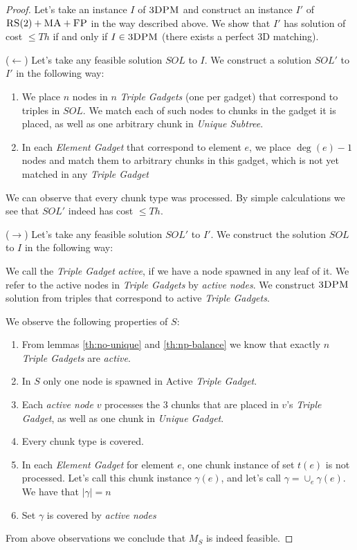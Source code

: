 \documentclass[preprint,12pt]{elsarticle}
\newcommand{\FP}{\textsc{FP}}
\newcommand{\RS}{\textsc{RS}}
\newcommand{\MA}{\textsc{MA}}
\newcommand{\TDPM}{\textsc{3DPM}}
\newcommand{\Unmatched}{\gamma}
\newcommand{\ActiveNode}{\textit{active node}}
\newcommand{\ActiveNodes}{\textit{active nodes}}
\newcommand{\Solution}{S}
\newcommand{\UnqSubtree}{{{\emph{Unique Subtree}}}}
\newcommand{\TripleGadget}{{\emph{Triple Gadget}}}
\newcommand{\TripleGadgets}{{\emph{Triple Gadgets}}}
\newcommand{\UnqGadget}{{\emph{Unique Gadget}}}
\newcommand{\ElGadget}{{\emph{Element Gadget}}}
\newcommand{\Thr}{\ensuremath{Th}}
\newcommand{\Sol}{\ensuremath{SOL}}
\begin{document}
\begin{proof}
  
  Let's take an instance $I$ of $\TDPM$ and construct an instance $I'$
  of $\RS(2)+\MA+\FP$ in the way described above.  We show that $I'$
  has solution of cost $\leq \Thr$ if and only if $I \in \TDPM$ (there
  exists a perfect 3D matching).

  ($\leftarrow$) Let's take any feasible solution $\Sol$ to $I$. We
  construct a solution $\Sol'$ to $I'$ in the following way:
  \begin{enumerate}
    \item We place $n$ nodes in $n$ {\TripleGadgets} (one per gadget)
    that correspond to triples in $\Sol$. We match each of such nodes
    to chunks in the gadget it is placed, as well as one arbitrary
    chunk in {\UnqSubtree}.
    \item In each {\ElGadget} that correspond to element $e$, we place
    $\deg(e) - 1$ nodes and match them to arbitrary chunks in this
    gadget, which is not yet matched in any {\TripleGadget}
  \end{enumerate}

  We can observe that every chunk type was processed. By simple
  calculations we see that $\Sol'$ indeed has cost $\leq \Thr$.

  ($\rightarrow$) Let's take any feasible solution $\Sol'$ to $I'$.
  We construct the solution $\Sol$ to $I$ in the following way:

  We call the {\TripleGadget} \textit{active}, if we have a node
  spawned in any leaf of it. We refer to the active nodes in
  {\TripleGadgets} by \ActiveNodes. We construct $\TDPM$ solution from
  triples that correspond to active \TripleGadgets.

  We observe the following properties of $\Solution$:
  \begin{enumerate}
    \item From lemmas \ref{th:no-unique} and \ref{th:np-balance} we
    know that exactly $n$ {\TripleGadgets} are \emph{active}.
    \item In $\Solution$ only one node is spawned in Active
    \TripleGadget.
    \item Each {\ActiveNode} $v$ processes the 3 chunks that are
    placed in $v$'s \TripleGadget, as well as one chunk in \UnqGadget.
    \item Every chunk type is covered.
    \item In each {\ElGadget} for element $e$, one chunk instance of
    set $t(e)$ is not processed. Let's call this chunk instance
    $\Unmatched(e)$, and let's call
    $\Unmatched = \cup_e \Unmatched(e)$. We have that
    $|\Unmatched| = n$
    \item Set $\Unmatched$ is covered by \ActiveNodes
  \end{enumerate}

  From above observations we conclude that $M_S$ is indeed feasible.
\end{proof}
\end{document}
